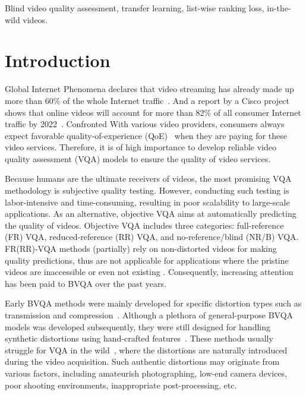 \documentclass[journal]{IEEEtran}
\begin{document}
\begin{IEEEkeywords}
Blind video quality assessment, transfer learning, list-wise ranking loss, in-the-wild videos.
\end{IEEEkeywords}


\IEEEpeerreviewmaketitle
\section{Introduction}\label{Sec:Introduction}
 Global Internet Phenomena declares that video streaming has already made up more than 60\% of the whole Internet traffic~\cite{GIP2019}. And a report by a Cisco project shows that online videos will account for more than 82\% of all consumer Internet traffic by 2022~\cite{cisco20172022forecast}. Confronted With various video providers, consumers always expect favorable quality-of-experience (QoE)~\cite{duanmu2016quality} when they are paying for these video services. Therefore, it is of high importance to develop reliable video quality assessment (VQA) models to ensure the quality of video services.

Because humans are the ultimate receivers of videos, the most promising VQA methodology is subjective quality testing. However, conducting such testing is labor-intensive and time-consuming, resulting in poor scalability to large-scale applications. As an alternative, objective VQA aims at automatically predicting the quality of videos. Objective VQA includes three categories: full-reference (FR) VQA, reduced-reference (RR) VQA, and no-reference/blind (NR/B) VQA. FR(RR)-VQA methods (partially) rely on non-distorted videos for making quality predictions, thus are not applicable for applications where the pristine videos are inaccessible or even not existing \cite{tu2021regression}. Consequently, increasing attention has been paid to BVQA over the past years.

Early BVQA methods were mainly developed for specific distortion types such as transmission and compression~\cite{amer2005fast, valenzise2011no, sogaard2015no}. Although a plethora of general-purpose BVQA models was developed subsequently, they were still designed for handling synthetic distortions using hand-crafted features~\cite{mittal2012no, saad2014blind, mittal2016completely}. These methods usually struggle for VQA in the wild~\cite{li2019quality}, where the distortions are naturally introduced during the video acquisition. Such authentic distortions may originate from various factors, including amateurish photographing, low-end camera devices, poor shooting environments, inappropriate post-processing, etc.
\end{document}
